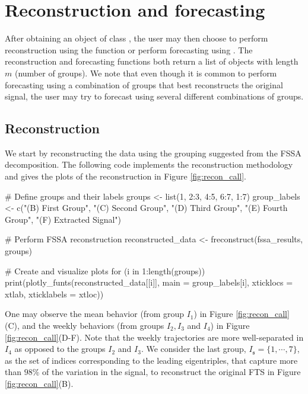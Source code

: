 \section{Reconstruction and forecasting}
After obtaining an object of class , the user may then choose to perform reconstruction using the  function or perform forecasting using . The reconstruction and forecasting functions both return a list of  objects with length $m$ (number of groups). We note that even though it is common to perform forecasting using a combination of groups that best reconstructs the original signal, the user may try to forecast using several different combinations of groups.

\subsection{Reconstruction}
We start by reconstructing the  data using the grouping suggested 
from the FSSA decomposition. The following code implements the reconstruction 
methodology and gives the plots of the reconstruction in Figure 
\ref{fig:recon_call}. 
\begin{example}
# Define groups and their labels
groups <- list(1, 2:3, 4:5, 6:7, 1:7)
group_labels <- c("(B) First Group",
	"(C) Second Group",
	"(D) Third Group",
	"(E) Fourth Group",
	"(F) Extracted Signal")

# Perform FSSA‌ reconstruction
reconstructed_data  <- freconstruct(fssa_results, groups)

# Create and visualize plots
for (i in 1:length(groups)) {
  print(plotly_funts(reconstructed_data[[i]], main = group_labels[i], 
  		xticklocs = xtlab, xticklabels = xtloc))
}
\end{example}
One may observe the mean behavior (from group $I_1$) in Figure \ref{fig:recon_call}(C), and the weekly behaviors (from groups $I_2, I_3$ and $I_4$) in Figure \ref{fig:recon_call}(D-F). Note that the weekly trajectories are more well-separated in $I_4$ as opposed to the groups $I_2$ and $I_3$. We consider the last group, $I_{\mathfrak{s}}=\{1,\cdots,7\}$, as the set of indices corresponding to the leading eigentriples, that capture more than $98\%$ of the variation in the signal, to reconstruct the original FTS in Figure \ref{fig:recon_call}(B).

